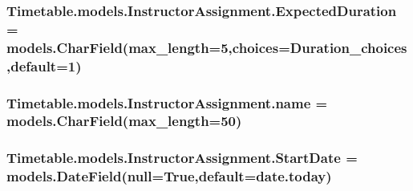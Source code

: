 \subsubsection[{\texorpdfstring{Expected\+Duration}{ExpectedDuration}}]{\setlength{\rightskip}{0pt plus 5cm}Timetable.\+models.\+Instructor\+Assignment.\+Expected\+Duration = models.\+Char\+Field(max\+\_\+length=5,choices={\bf Duration\+\_\+choices},default=\textquotesingle{}1\textquotesingle{})\hspace{0.3cm}{\ttfamily [static]}}\hypertarget{classTimetable_1_1models_1_1InstructorAssignment_a01e40f725e26619a0274fdd01d7c0a0d}{}\label{classTimetable_1_1models_1_1InstructorAssignment_a01e40f725e26619a0274fdd01d7c0a0d}
\subsubsection[{\texorpdfstring{name}{name}}]{\setlength{\rightskip}{0pt plus 5cm}Timetable.\+models.\+Instructor\+Assignment.\+name = models.\+Char\+Field(max\+\_\+length=50)\hspace{0.3cm}{\ttfamily [static]}}\hypertarget{classTimetable_1_1models_1_1InstructorAssignment_a88f88adb93da287ea6257d10f644deba}{}\label{classTimetable_1_1models_1_1InstructorAssignment_a88f88adb93da287ea6257d10f644deba}
\subsubsection[{\texorpdfstring{Start\+Date}{StartDate}}]{\setlength{\rightskip}{0pt plus 5cm}Timetable.\+models.\+Instructor\+Assignment.\+Start\+Date = models.\+Date\+Field(null=True,default=date.\+today)\hspace{0.3cm}{\ttfamily [static]}}\hypertarget{classTimetable_1_1models_1_1InstructorAssignment_a4118305183920242785ffd38f427504d}{}\label{classTimetable_1_1models_1_1InstructorAssignment_a4118305183920242785ffd38f427504d}
